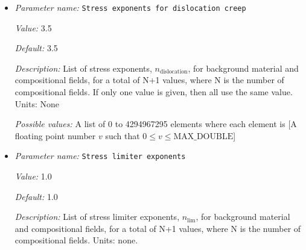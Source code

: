 \begin{itemize}
{\it Value:} 1


{\it Default:} 1


{\it Description:} List of stress exponents, $n_{\text{diffusion}}$, for background material and compositional fields, for a total of N+1 values, where N is the number of compositional fields. If only one value is given, then all use the same value.  Units: None


{\it Possible values:} A list of 0 to 4294967295 elements where each element is [A floating point number $v$ such that $0 \leq v \leq \text{MAX\_DOUBLE}$]
\item {\it Parameter name:} {\tt Stress exponents for dislocation creep}
\label{parameters:Material model/Visco Plastic/Stress exponents for dislocation creep}
\label{parameters:Material_20model/Visco_20Plastic/Stress_20exponents_20for_20dislocation_20creep}


{\it Value:} 3.5


{\it Default:} 3.5


{\it Description:} List of stress exponents, $n_{\text{dislocation}}$, for background material and compositional fields, for a total of N+1 values, where N is the number of compositional fields. If only one value is given, then all use the same value.  Units: None


{\it Possible values:} A list of 0 to 4294967295 elements where each element is [A floating point number $v$ such that $0 \leq v \leq \text{MAX\_DOUBLE}$]
\item {\it Parameter name:} {\tt Stress limiter exponents}
\label{parameters:Material model/Visco Plastic/Stress limiter exponents}
\label{parameters:Material_20model/Visco_20Plastic/Stress_20limiter_20exponents}


{\it Value:} 1.0


{\it Default:} 1.0


{\it Description:} List of stress limiter exponents, $n_{\text{lim}}$, for background material and compositional fields, for a total of N+1 values, where N is the number of compositional fields. Units: none.



\end{itemize}
